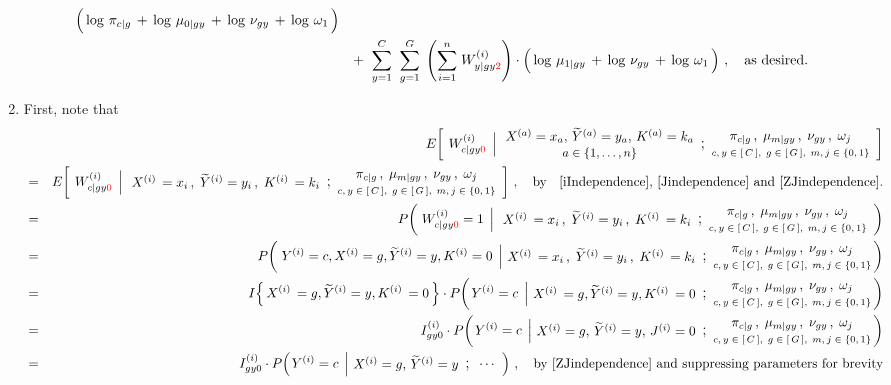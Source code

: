\begin{enumerate}
\begin{eqnarray*}
	\left(\,
		\log\,\pi_{c \vert g}
		\,\overset{{\color{white}.}}{+}\,
		\log\,\mu_{0\vert gy}
		\,\overset{{\color{white}.}}{+}\,
		\log\,\nu_{gy}
		\,\overset{{\color{white}.}}{+}\,
		\log\,\omega_{1}
	\,\right)
\\
&&
	+ \;\;
	\overset{C}{\underset{y=1}{\sum}}\;\;
	\overset{G}{\underset{g=1}{\sum}}\;
	\left(\overset{n}{\underset{i=1}{\sum}}\;W^{(i)}_{y \vert gy{\color{red}2}}\right)
	\cdot
	\left(\,
		\log\,\mu_{1 \vert gy}
		\,\overset{{\color{white}.}}{+}\,
		\log\,\nu_{gy}
		\,\overset{{\color{white}.}}{+}\,
		\log\,\omega_{1}
	\,\right)\,,
	\quad
	\textnormal{as desired.}
\end{eqnarray*}
\item
	First, note that
	\begin{eqnarray*}
	&&
		E\!\left[\;
			\left.
			W^{(i)}_{c \vert gy{\color{red}0}}
			\,\;\right\vert
			\EMConditionsWithValues
		\right]
	\\
	&=&
		E\!\left[\;
			\left.
			W^{(i)}_{c \vert gy{\color{red}0}}
			\,\;\right\vert
			\ithEMConditionsWithValues
		\right]\,,
		\quad
		\textnormal{by \; \eqref{iIndependence}, \eqref{Jindependence} and \eqref{ZJindependence}.}
	\\
	&=&
		P\!\left(\,
			\left.
			W^{(i)}_{c \vert gy{\color{red}0}} = 1
			\,\;\right\vert
			\ithEMConditionsWithValues
		\right)
	\\
	&=&
		P\!\left(\,
			\left.
			Y^{(i)} = c, X^{(i)} = g, \widetilde{Y}^{(i)} = y, K^{(i)} = 0
			\,\;\right\vert
			\!\!
			\ithEMConditionsWithValues
		\!\!\right)
	\\
	&=&
		I\!\left\{\,X^{(i)}\,=g , \widetilde{Y}^{(i)}=y , K^{(i)}\,=0\,\right\}
		\cdot
		P\!\left(
			\left.
			Y^{(i)} = c
			\,\;\right\vert
			\!\!
			\ithGYZeroEMConditionsWithValues
		\!\!\right)
	\\
	&=&
		I^{(i)}_{gy0}
		\cdot
		P\!\left(
			\left.
			Y^{(i)} = c
			\,\;\right\vert
			\!\!
			\begin{array}{c}
				X^{(i)} = g,\, \widetilde{Y}^{(i)} = y,\, J^{(i)} = 0
			\end{array}
			\textnormal{\large;}
			\modelParameters
		\!\!\right)
	\\
	&=&
		I^{(i)}_{gy0}
		\cdot
		P\!\left(
			\left.
			Y^{(i)} = c
			\,\;\right\vert
			\!\!
			\begin{array}{c}
				X^{(i)} = g,\, \widetilde{Y}^{(i)} = y
			\end{array}
			\textnormal{\large;}
			\;\;\cdots\;\;
		\right)\,,
		\quad
		\textnormal{by \eqref{ZJindependence} and suppressing parameters for brevity}

\end{eqnarray*}
\end{enumerate}
